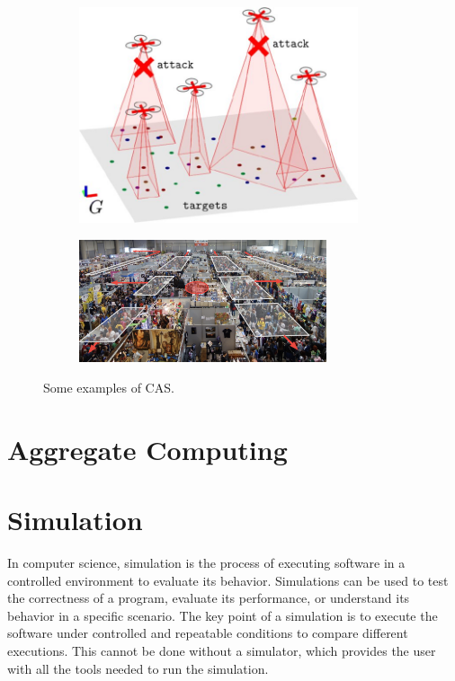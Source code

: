 \documentclass[12pt,a4paper,openright,twoside]{book}
\begin{document}
\begin{figure}[t]
  \centering
  \begin{subfigure}[b]{0.49\textwidth}
      \centering
      \includegraphics[width=0.9\textwidth]{figures/swarm2.jpeg}
  \end{subfigure}

  \begin{subfigure}[b]{0.49\textwidth}
      \centering
      \includegraphics[width=0.8\textwidth]{figures/crowd.png}
  \end{subfigure}
  \caption{Some examples of CAS.}
\end{figure}

\section{Aggregate Computing}



\section{Simulation}

In computer science, simulation is the process of executing software in a controlled environment to evaluate its behavior. 
Simulations can be used to test the correctness of a program, evaluate its performance, or understand its behavior in a specific scenario. 
The key point of a simulation is to execute the software under controlled and repeatable conditions to compare different executions. 
This cannot be done without a simulator, which provides the user with all the tools needed to run the simulation. \cite{argun2021simulation, bagrodia1998parsec}
\end{document}
